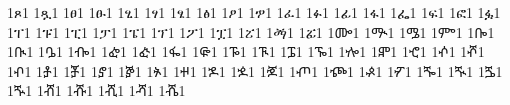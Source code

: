 {1ጾ1 %
1ጿ1 %
1ፀ1 %
1ፁ1 %
1ፂ1 %
1ፃ1 %
1ፄ1 %
1ፅ1 %
1ፆ1 %
1ፇ1 %
1ፈ1 %
1ፉ1 %
1ፊ1 %
1ፋ1 %
1ፌ1 %
1ፍ1 %
1ፎ1 %
1ፏ1 %
1ፐ1 %
1ፑ1 %
1ፒ1 %
1ፓ1 %
1ፔ1 %
1ፕ1 %
1ፖ1 %
1ፗ1 %
1ፘ1 %
1ፙ1 %
1ፚ1 %
1ᎀ1 %
1ᎁ1 %
1ᎂ1 %
1ᎃ1 %
1ᎄ1 %
1ᎅ1 %
1ᎆ1 %
1ᎇ1 %
1ᎈ1 %
1ᎉ1 %
1ᎊ1 %
1ᎋ1 %
1ᎌ1 %
1ᎍ1 %
1ᎎ1 %
1ᎏ1 %
1ⶀ1 %
1ⶁ1 %
1ⶂ1 %
1ⶃ1 %
1ⶄ1 %
1ⶅ1 %
1ⶆ1 %
1ⶇ1 %
1ⶈ1 %
1ⶉ1 %
1ⶊ1 %
1ⶋ1 %
1ⶌ1 %
1ⶍ1 %
1ⶎ1 %
1ⶏ1 %
1ⶐ1 %
1ⶑ1 %
1ⶒ1 %
1ⶓ1 %
1ⶔ1 %
1ⶕ1 %
1ⶖ1 %
1ⶠ1 %
1ⶡ1 %
1ⶢ1 %
1ⶣ1 %
1ⶤ1 %
}
